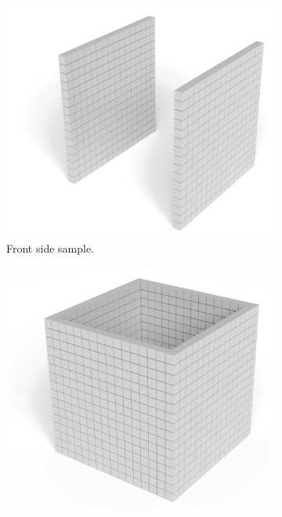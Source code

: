\begin{figure}[h]
    \centering
    \begin{subfigure}[t]{0.3\textwidth}
        \centering
        \includegraphics[width=\textwidth]{sections/methodology/figures/voxels-merge-1.png}
        \caption{Front side sample.}
    \end{subfigure}
    \hfill
    \begin{subfigure}[t]{0.3\textwidth}
        \centering
        \includegraphics[width=\textwidth]{sections/methodology/figures/voxels-merge-2.png}

\end{subfigure}
\end{figure}
